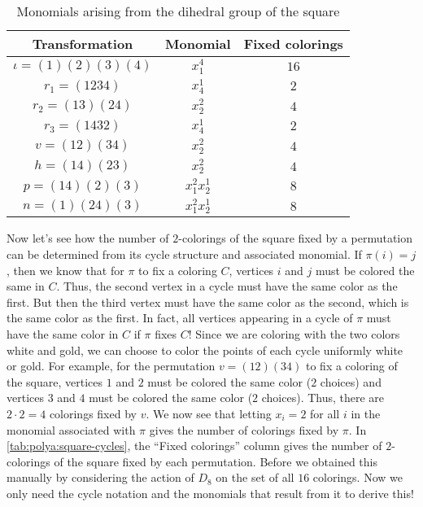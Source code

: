 \begin{table}
  \centering
  \begin{tabular}{c|c|c}
    Transformation & Monomial & Fixed colorings\\\hline
    $\iota = (1)(2)(3)(4)$  & $x_1^4$& $16$\\[\smallskipamount]
    $r_1 = (1234)$ & $x_4^1$ & $2$\\[\smallskipamount]
    $r_2=(13)(24)$ & $x_2^2$ & $4$\\[\smallskipamount]
    $r_3=(1432)$ & $x_4^1$ & $2$\\[\smallskipamount]
    $v=(12)(34)$ & $x_2^2$ & $4$\\[\smallskipamount]
    $h=(14)(23)$ & $x_2^2$ & $4$\\[\smallskipamount]
    $p=(14)(2)(3)$ & $x_1^2x_2^1$ & $8$\\[\smallskipamount]
    $n=(1)(24)(3)$ & $x_1^2x_2^1$ & $8$
  \end{tabular}
  \caption{Monomials arising from the dihedral group of the square}
  \label{tab:polya:square-cycles}
\end{table}

Now let's see how the number of $2$-colorings of the square fixed by a
permutation can be determined from its cycle structure and associated
monomial. If $\pi(i)=j$, then we know that for $\pi$ to fix a coloring
$C$, vertices $i$ and $j$ must be colored the same in $C$. Thus, the
second vertex in a cycle must have the same color as the first. But
then the third vertex must have the same color as the second, which is
the same color as the first. In fact, all vertices appearing in a
cycle of $\pi$ must have the same color in $C$ if $\pi$ fixes $C$!
Since we are coloring with the two colors white and gold, we can
choose to color the points of each cycle uniformly white or gold. For
example, for the permutation $v=(12)(34)$ to fix a coloring of the
square, vertices $1$ and $2$ must be colored the same color ($2$
choices) and vertices $3$ and $4$ must be colored the same color ($2$
choices). Thus, there are $2\cdot 2=4$ colorings fixed by $v$. We now
see that letting $x_i=2$ for all $i$ in the monomial associated with
$\pi$ gives the number of colorings fixed by $\pi$. In
\autoref{tab:polya:square-cycles}, the ``Fixed colorings'' column
gives the number of $2$-colorings of the square fixed by each
permutation. Before we obtained this manually by considering the
action of $D_8$ on the set of all $16$ colorings. Now we only need the
cycle notation and the monomials that result from it to derive this!


